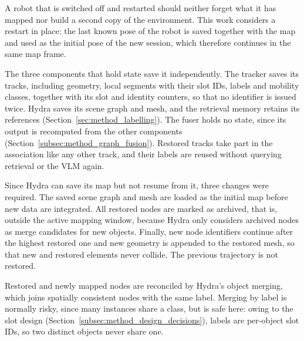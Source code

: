 {\small
A robot that is switched off and restarted should neither forget what it has mapped nor build a second copy of the environment. This work considers a restart in place: the last known pose of the robot is saved together with the map and used as the initial pose of the new session, which therefore continues in the same map frame.

The three components that hold state save it independently. The tracker saves its tracks, including geometry, local segments with their slot IDs, labels and mobility classes, together with its slot and identity counters, so that no identifier is issued twice. Hydra saves its scene graph and mesh, and the retrieval memory retains its references (Section~\ref{sec:method_labelling}). The fuser holds no state, since its output is recomputed from the other components (Section~\ref{subsec:method_graph_fusion}). Restored tracks take part in the association like any other track, and their labels are reused without querying retrieval or the VLM again.

Since Hydra can save its map but not resume from it, three changes were required. The saved scene graph and mesh are loaded as the initial map before new data are integrated. All restored nodes are marked as archived, that is, outside the active mapping window, because Hydra only considers archived nodes as merge candidates for new objects. Finally, new node identifiers continue after the highest restored one and new geometry is appended to the restored mesh, so that new and restored elements never collide. The previous trajectory is not restored.

Restored and newly mapped nodes are reconciled by Hydra's object merging, which joins spatially consistent nodes with the same label. Merging by label is normally risky, since many instances share a class, but is safe here: owing to the slot design (Section~\ref{subsec:method_design_decisions}), labels are per-object slot IDs, so two distinct objects never share one.
\par}